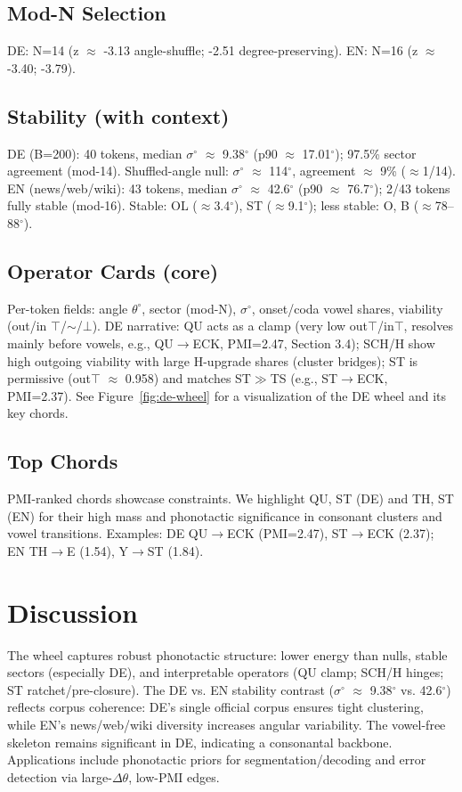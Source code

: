 \documentclass[10pt]{article}
\begin{document}
\subsection{Mod-N Selection}
DE: N=14 (z $\approx$ -3.13 angle-shuffle; -2.51 degree-preserving).  
EN: N=16 (z $\approx$ -3.40; -3.79).

\subsection{Stability (with context)}
DE (B=200): 40 tokens, median $\sigma^\circ$ $\approx$ 9.38$^\circ$ (p90 $\approx$ 17.01$^\circ$); 97.5\% sector agreement (mod-14). Shuffled-angle null: $\sigma^\circ$ $\approx$ 114$^\circ$, agreement $\approx$ 9\% ($\approx$1/14).  
EN (news/web/wiki): 43 tokens, median $\sigma^\circ$ $\approx$ 42.6$^\circ$ (p90 $\approx$ 76.7$^\circ$); 2/43 tokens fully stable (mod-16). Stable: OL ($\approx$3.4$^\circ$), ST ($\approx$9.1$^\circ$); less stable: O, B ($\approx$78–88$^\circ$).

\subsection{Operator Cards (core)}
Per-token fields: angle $\theta^\circ$, sector (mod-N), $\sigma^\circ$, onset/coda vowel shares, viability (out/in $\top$/$\sim$/$\bot$).  
DE narrative: QU acts as a clamp (very low out$\top$/in$\top$, resolves mainly before vowels, e.g., QU$\to$ECK, PMI=2.47, Section 3.4); SCH/H show high outgoing viability with large H-upgrade shares (cluster bridges); ST is permissive (out$\top$ $\approx$ 0.958) and matches ST$\gg$TS (e.g., ST$\to$ECK, PMI=2.37). See Figure~\ref{fig:de-wheel} for a visualization of the DE wheel and its key chords.

\subsection{Top Chords}
PMI-ranked chords showcase constraints. We highlight QU, ST (DE) and TH, ST (EN) for their high mass and phonotactic significance in consonant clusters and vowel transitions. Examples: DE QU$\to$ECK (PMI=2.47), ST$\to$ECK (2.37); EN TH$\to$E (1.54), Y$\to$ST (1.84).

\section{Discussion}
The wheel captures robust phonotactic structure: lower energy than nulls, stable sectors (especially DE), and interpretable operators (QU clamp; SCH/H hinges; ST ratchet/pre-closure). The DE vs. EN stability contrast ($\sigma^\circ$ $\approx$ 9.38$^\circ$ vs. 42.6$^\circ$) reflects corpus coherence: DE’s single official corpus ensures tight clustering, while EN’s news/web/wiki diversity increases angular variability. The vowel-free skeleton remains significant in DE, indicating a consonantal backbone. Applications include phonotactic priors for segmentation/decoding and error detection via large-$\Delta\theta$, low-PMI edges.
\end{document}
